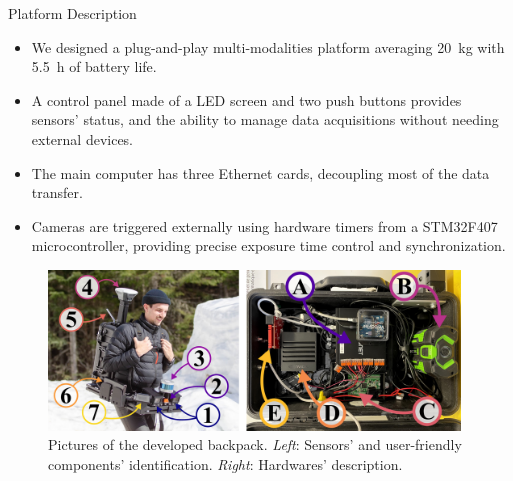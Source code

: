 \documentclass[final,hyperref={pdfpagelabels=false}]{beamer}
\begin{document}
\begin{frame}[t]
\begin{columns}[t]
\begin{column}{.484\textwidth}
\begin{block}{Platform Description}
	\begin{itemize}
		\item We designed a plug-and-play multi-modalities platform averaging \SI{20}{\kilo\gram} with \SI{5.5}{\hour} of battery life.
		\item A control panel made of a LED screen and two push buttons provides sensors' status, and the ability to manage data acquisitions without needing external devices. 
		\item The main computer has three Ethernet cards, decoupling most of the data transfer.
		\item Cameras are triggered externally using hardware timers from a STM32F407 microcontroller, providing precise exposure time control and synchronization.
	\end{itemize}
	\begin{figure}%
		\includegraphics[width=0.975\textwidth]{./figures/backpack_sensors_and_inside.pdf}
		\captionsetup{width = 0.975\linewidth, justification=justified, name=Figure 2}
		\caption{
			Pictures of the developed backpack.
			\textit{Left}: Sensors' and user-friendly components' identification.
			\textit{Right}: Hardwares' description.
			}
	\end{figure}

\end{block}
\end{column}
\end{columns}
\end{frame}
\end{document}
